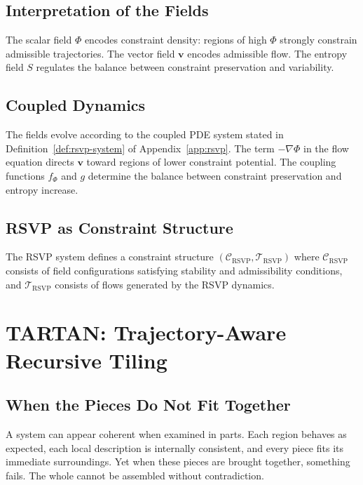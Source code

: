 \documentclass[11pt,openany]{book}
\begin{document}
\section{Interpretation of the Fields}
\label{sec:interpretation}

The scalar field $\Phi$ encodes constraint density: regions
of high $\Phi$ strongly constrain admissible trajectories.
The vector field $\boldsymbol{v}$ encodes admissible flow.
The entropy field $S$ regulates the balance between
constraint preservation and variability.

\section{Coupled Dynamics}
\label{sec:dynamics}

The fields evolve according to the coupled PDE system
stated in Definition~\ref{def:rsvp-system} of
Appendix~\ref{app:rsvp}. The term $-\nabla\Phi$ in the
flow equation directs $\boldsymbol{v}$ toward regions of
lower constraint potential. The coupling functions $f_\Phi$
and $g$ determine the balance between constraint
preservation and entropy increase.

\section{RSVP as Constraint Structure}
\label{sec:interpretation-constraint}

\begin{proposition}
\label{prop:rsvp-constraint}
The RSVP system defines a constraint structure
$(\mathcal{C}_{\mathrm{RSVP}}, \mathcal{T}_{\mathrm{RSVP}})$
where $\mathcal{C}_{\mathrm{RSVP}}$ consists of field
configurations satisfying stability and admissibility
conditions, and $\mathcal{T}_{\mathrm{RSVP}}$ consists of
flows generated by the RSVP dynamics.
\end{proposition}


\chapter{TARTAN: Trajectory-Aware Recursive Tiling}
\label{ch:tartan}

\section*{ When the Pieces Do Not Fit Together}

A system can appear coherent when examined in parts. Each region behaves as expected, each local description is internally consistent, and every piece fits its immediate surroundings. Yet when these pieces are brought together, something fails. The whole cannot be assembled without contradiction.
\end{document}
